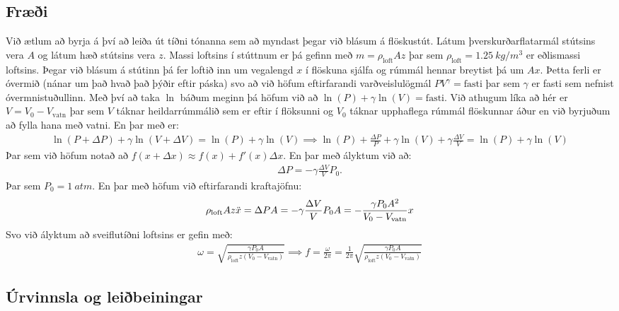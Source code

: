 \documentclass[oneside]{book}
\theoremstyle{definition}
\begin{document}
\subsection*{Fræði}

Við ætlum að byrja á því að leiða út tíðni tónanna sem að myndast þegar við blásum á flöskustút. Látum þverskurðarflatarmál stútsins vera $A$ og látum hæð stútsins vera $z$. Massi loftsins í stúttnum er þá gefinn með $m = \rho_{\text{loft}} A z$ þar sem $\rho_{\text{loft}} = \SI{1.25}{kg/m^3}$ er eðlismassi loftsins. Þegar við blásum á stútinn þá fer loftið inn um vegalengd $x$ í flöskuna sjálfa og rúmmál hennar breytist þá um $Ax$. Þetta ferli er óvermið (nánar um það hvað það þýðir eftir páska) svo að við höfum eftirfarandi varðveislulögmál $PV^\gamma = \text{fasti}$ þar sem $\gamma$ er fasti sem nefnist óvermnistuðullinn. Með því að taka $\ln$ báðum meginn þá höfum við að $\ln(P) + \gamma \ln(V) = \text{fasti}$. Við athugum líka að hér er $V = V_0 - V_{\text{vatn}}$ þar sem $V$ táknar heildarrúmmálið sem er eftir í flöksunni og $V_0$ táknar upphaflega rúmmál flöskunnar áður en við byrjuðum að fylla hana með vatni. En þar með er:
\begin{align*}
    \ln(P+\Delta P) +\gamma \ln(V + \Delta V) = \ln(P) + \gamma \ln(V) \implies \ln(P) + \frac{\Delta P}{P} + \gamma \ln(V) + \gamma \frac{\Delta V}{V} = \ln(P) + \gamma \ln(V)
\end{align*}
Þar sem við höfum notað að $f(x+\Delta x) \approx f(x) + f'(x)\Delta x$. En þar með ályktum við að:
\begin{align*}
    \Delta P = - \gamma \frac{\Delta V}{V}P_0.
\end{align*}
Þar sem $P_0 = \SI{1}{atm}$. En þar með höfum við eftirfarandi kraftajöfnu:
\begin{align*}
    \rho_{\text{loft}} Az \Ddot{x} = \Delta P A = -\gamma \frac{\Delta V}{V} P_0 A = - \frac{\gamma P_0 A^2}{V_0 - V_{\text{vatn}}}x
\end{align*}
Svo við ályktum að sveiflutíðni loftsins er gefin með:
\begin{align} \label{eq:tidni}
    \omega = \sqrt{\frac{\gamma P_0 A}{\rho_{\text{loft}}z (V_0 - V_{\text{vatn}})}} \implies f = \frac{\omega }{2\pi} = \frac{1}{2\pi}\sqrt{\frac{\gamma P_0 A}{\rho_{\text{loft}}z (V_0 - V_{\text{vatn}})}}
\end{align}

\subsection*{Úrvinnsla og leiðbeiningar}
\end{document}
